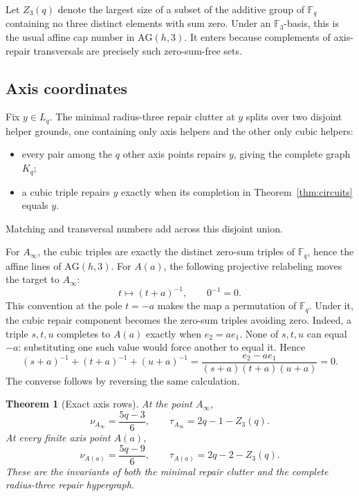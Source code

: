 \documentclass[11pt]{article}
\newtheorem{theorem}{Theorem}[section]
\theoremstyle{definition}
\theoremstyle{remark}
\newcommand{\F}{\mathbb{F}}
\begin{document}
Let $Z_3(q)$ denote the largest size of a subset of the additive group of
$\F_q$ containing no three distinct elements with sum zero.  Under an
$\F_3$-basis, this is the usual affine cap number in $\mathrm{AG}(h,3)$.
It enters because complements of axis-repair transversals are precisely such
zero-sum-free sets.

\subsection{Axis coordinates}

Fix $y\in L_q$.  The minimal radius-three repair clutter at $y$ splits over
two disjoint helper grounds, one containing only axis helpers and the other
only cubic helpers:
\begin{itemize}[leftmargin=2em]
\item every pair among the $q$ other axis points repairs $y$, giving the
      complete graph $K_q$;
\item a cubic triple repairs $y$ exactly when its completion in
      Theorem~\ref{thm:circuits} equals $y$.
\end{itemize}
Matching and transversal numbers add across this disjoint union.

For $A_\infty$, the cubic triples are exactly the distinct zero-sum triples
of $\F_q$, hence the affine lines of $\mathrm{AG}(h,3)$.  For $A(a)$, the
following projective relabeling moves the target to $A_\infty$:
\[
 t\longmapsto(t+a)^{-1},\qquad 0^{-1}=0.
\]
This convention at the pole $t=-a$ makes the map a permutation of $\F_q$.
Under it, the cubic repair component becomes the zero-sum triples avoiding
zero.  Indeed, a triple $s,t,u$ completes to $A(a)$ exactly when
$e_2=ae_1$.  None of $s,t,u$ can equal $-a$: substituting one such value
would force another to equal it.  Hence
\[
 (s+a)^{-1}+(t+a)^{-1}+(u+a)^{-1}
 =\frac{e_2-ae_1}{(s+a)(t+a)(u+a)}=0.
\]
The converse follows by reversing the same calculation.

\begin{theorem}[Exact axis rows]\label{thm:axis-rows}
At the point $A_\infty$,
\[
 \nu_{A_\infty}=\frac{5q-3}{6},
 \qquad
 \tau_{A_\infty}=2q-1-Z_3(q).
\]
At every finite axis point $A(a)$,
\[
 \nu_{A(a)}=\frac{5q-9}{6},
 \qquad
 \tau_{A(a)}=2q-2-Z_3(q).
\]
These are the invariants of both the minimal repair clutter and the complete
radius-three repair hypergraph.
\end{theorem}
\end{document}
